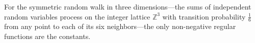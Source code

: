 For the symmetric random walk in three dimensions---the sums of independent random variables process on the integer lattice $\mathbb{Z}^3$ with transition probability $\frac{1}{6}$ from any point to each of its six neighbors---the only non-negative regular functions are the constants.
